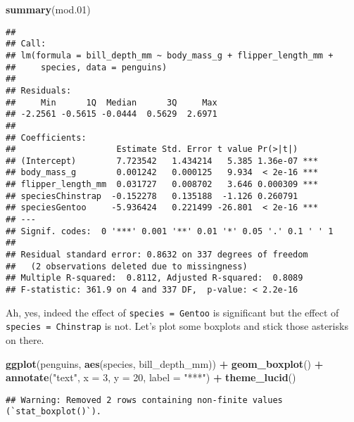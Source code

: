 \documentclass[
]{article}
\newenvironment{Shaded}{\begin{snugshade}}{\end{snugshade}}
\newcommand{\AttributeTok}[1]{\textcolor[rgb]{0.13,0.29,0.53}{#1}}
\newcommand{\DecValTok}[1]{\textcolor[rgb]{0.00,0.00,0.81}{#1}}
\newcommand{\FloatTok}[1]{\textcolor[rgb]{0.00,0.00,0.81}{#1}}
\newcommand{\FunctionTok}[1]{\textcolor[rgb]{0.13,0.29,0.53}{\textbf{#1}}}
\newcommand{\NormalTok}[1]{#1}
\newcommand{\SpecialCharTok}[1]{\textcolor[rgb]{0.81,0.36,0.00}{\textbf{#1}}}
\newcommand{\StringTok}[1]{\textcolor[rgb]{0.31,0.60,0.02}{#1}}
\begin{document}
\begin{Shaded}
\begin{Highlighting}[]
\FunctionTok{summary}\NormalTok{(mod}\FloatTok{.01}\NormalTok{)}
\end{Highlighting}
\end{Shaded}

\begin{verbatim}
## 
## Call:
## lm(formula = bill_depth_mm ~ body_mass_g + flipper_length_mm + 
##     species, data = penguins)
## 
## Residuals:
##     Min      1Q  Median      3Q     Max 
## -2.2561 -0.5615 -0.0444  0.5629  2.6971 
## 
## Coefficients:
##                    Estimate Std. Error t value Pr(>|t|)    
## (Intercept)        7.723542   1.434214   5.385 1.36e-07 ***
## body_mass_g        0.001242   0.000125   9.934  < 2e-16 ***
## flipper_length_mm  0.031727   0.008702   3.646 0.000309 ***
## speciesChinstrap  -0.152278   0.135188  -1.126 0.260791    
## speciesGentoo     -5.936424   0.221499 -26.801  < 2e-16 ***
## ---
## Signif. codes:  0 '***' 0.001 '**' 0.01 '*' 0.05 '.' 0.1 ' ' 1
## 
## Residual standard error: 0.8632 on 337 degrees of freedom
##   (2 observations deleted due to missingness)
## Multiple R-squared:  0.8112, Adjusted R-squared:  0.8089 
## F-statistic: 361.9 on 4 and 337 DF,  p-value: < 2.2e-16
\end{verbatim}

Ah, yes, indeed the effect of \texttt{species\ =\ Gentoo} is significant
but the effect of \texttt{species\ =\ Chinstrap} is not. Let's plot some
boxplots and stick those asterisks on there.

\begin{Shaded}
\begin{Highlighting}[]
\FunctionTok{ggplot}\NormalTok{(penguins, }\FunctionTok{aes}\NormalTok{(species, bill\_depth\_mm)) }\SpecialCharTok{+}
  \FunctionTok{geom\_boxplot}\NormalTok{() }\SpecialCharTok{+}
  \FunctionTok{annotate}\NormalTok{(}\StringTok{"text"}\NormalTok{, }\AttributeTok{x =} \DecValTok{3}\NormalTok{, }\AttributeTok{y =} \DecValTok{20}\NormalTok{, }\AttributeTok{label =} \StringTok{"***"}\NormalTok{) }\SpecialCharTok{+}
  \FunctionTok{theme\_lucid}\NormalTok{()}
\end{Highlighting}
\end{Shaded}

\begin{verbatim}
## Warning: Removed 2 rows containing non-finite values (`stat_boxplot()`).
\end{verbatim}
\end{document}
